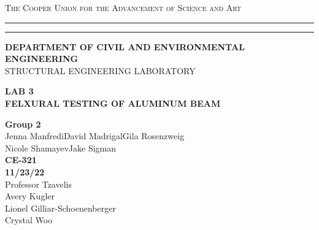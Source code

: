 \begin{titlepage}
    \begin{center}
    {{\Large{\textsc{The Cooper Union for the Advancement of Science and Art}}}} \rule[0.1cm]{15.8cm}{0.1mm}
    \rule[0.5cm]{15.8cm}{0.6mm}
    {\small{\bf DEPARTMENT OF CIVIL AND ENVIRONMENTAL ENGINEERING}}\\
    {\footnotesize{STRUCTURAL ENGINEERING LABORATORY}}
    \end{center}
    \vspace{15mm}
    \begin{center}
    {\large{\bf LAB 3\\}}
    \vspace{5mm}
    {\Large{\bf FELXURAL TESTING OF ALUMINUM BEAM}}
    \end{center}
    \vspace{35mm}
    \par
    \noindent
    \hfill
    \vspace{20mm}
    \begin{center}
    {\large{ {\bf Group 2} \\ { Jenna Manfredi\hspace{5mm}David Madrigal\hspace{5mm}Gila Rosenzweig\\Nicole Shamayev\hspace{5mm}Jake Sigman}}}
    \vspace{40mm}
    {\large {\bf \\CE-321 \\ 11/23/22 \\}}
    \vspace{15mm}
    {\normalsize{Professor Tzavelis \\ Avery Kugler \\ Lionel Gilliar-Schoenenberger \\ Crystal Woo}}
    \end{center}
\end{titlepage}